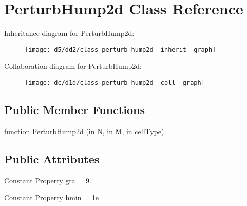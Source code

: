 \hypertarget{class_perturb_hump2d}{}\section{Perturb\+Hump2d Class Reference}
\label{class_perturb_hump2d}


Inheritance diagram for Perturb\+Hump2d\+:
\nopagebreak
\begin{figure}[H]
\begin{center}
\leavevmode
\texttt{[image: d5/dd2/class\_perturb\_hump2d\_\_inherit\_\_graph]}
\end{center}
\end{figure}


Collaboration diagram for Perturb\+Hump2d\+:
\nopagebreak
\begin{figure}[H]
\begin{center}
\leavevmode
\texttt{[image: dc/d1d/class\_perturb\_hump2d\_\_coll\_\_graph]}
\end{center}
\end{figure}
\subsection*{Public Member Functions}
\begin{DoxyCompactItemize}
\item 
function \hyperlink{class_perturb_hump2d_a1a57feff078e31a6b4e37dfe9266a53e}{Perturb\+Hump2d} (in N, in M, in cell\+Type)
\end{DoxyCompactItemize}
\subsection*{Public Attributes}
\begin{DoxyCompactItemize}
\item 
Constant Property \hyperlink{class_perturb_hump2d_a08db0f35e43eb8415a0866f7617fc822}{gra} = 9.
\item 
Constant Property \hyperlink{class_perturb_hump2d_ab507f8e127910a0be215d468c7eb055f}{hmin} = 1e
\end{DoxyCompactItemize}

